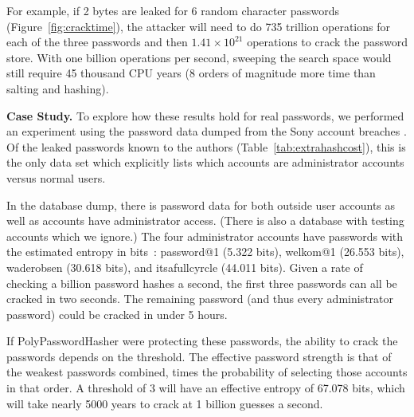 For example, if 2 bytes are leaked for 6 random character
passwords (Figure~\ref{fig:cracktime}), the attacker will need to do
735 trillion operations for each of the
three passwords and then $1.41 \times 10^{21}$ operations to crack the password
store.   With one billion operations per second, sweeping the search
space would still require 45 thousand CPU years (8 orders of magnitude
more time than salting and hashing).






{\bf Case Study.}
To explore how these results hold for real passwords, we performed an
experiment using the password data dumped from the Sony account breaches
\cite{sonyhack}.   Of the leaked passwords known to the authors
(Table~\ref{tab:extrahashcost}), this is the only data set which 
explicitly lists which accounts are administrator accounts versus normal users.

In the database dump, there is password data for both outside
user accounts as well as accounts have administrator access.   (There is
also a database with testing accounts which we ignore.)
The four administrator accounts have passwords with the estimated
entropy in bits~\cite{passwordstrength}:
password@1 (5.322 bits), %
welkom@1 (26.553 bits),
waderobsen (30.618 bits), %
and itsafullcyrcle (44.011 bits).   
Given a rate of checking a billion password hashes a second, the first 
three passwords can all be cracked in two seconds.   The
remaining password (and thus every administrator password) could be
cracked in under 5 hours.

If PolyPasswordHasher were protecting these passwords, the ability to crack the
passwords depends on the threshold.   The effective password strength is 
that of the weakest passwords combined, times the probability of selecting
those accounts in that order.  
A threshold of 3 will have an effective entropy of 67.078 bits,
which will take nearly 5000 years to crack at 1 billion guesses a second. 

